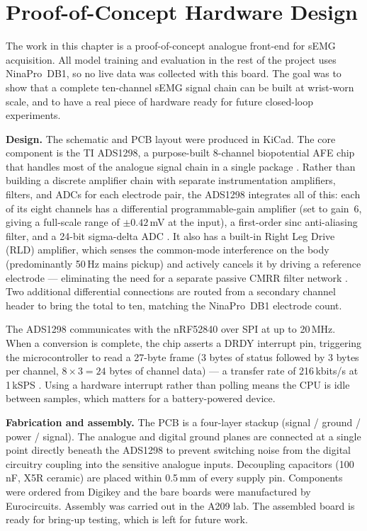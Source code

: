 \documentclass[11pt]{article}
\begin{document}
\section{Proof-of-Concept Hardware Design}
\label{sec:hw_exp}

The work in this chapter is a proof-of-concept analogue front-end for sEMG acquisition. All model training and evaluation in the rest of the project uses NinaPro~DB1, so no live data was collected with this board. The goal was to show that a complete ten-channel sEMG signal chain can be built at wrist-worn scale, and to have a real piece of hardware ready for future closed-loop experiments.

\textbf{Design.} The schematic and PCB layout were produced in KiCad. The core component is the TI ADS1298, a purpose-built 8-channel biopotential AFE chip that handles most of the analogue signal chain in a single package \cite{ads1298datasheet}. Rather than building a discrete amplifier chain with separate instrumentation amplifiers, filters, and ADCs for each electrode pair, the ADS1298 integrates all of this: each of its eight channels has a differential programmable-gain amplifier (set to gain~6, giving a full-scale range of ${\pm}0.42$\,mV at the input), a first-order sinc anti-aliasing filter, and a 24-bit sigma-delta ADC \cite{ads1298datasheet}. It also has a built-in Right Leg Drive (RLD) amplifier, which senses the common-mode interference on the body (predominantly 50\,Hz mains pickup) and actively cancels it by driving a reference electrode — eliminating the need for a separate passive CMRR filter network \cite{ads1298datasheet,ti_e2e_ads1298}. Two additional differential connections are routed from a secondary channel header to bring the total to ten, matching the NinaPro~DB1 electrode count.

The ADS1298 communicates with the nRF52840 over SPI at up to 20\,MHz. When a conversion is complete, the chip asserts a DRDY interrupt pin, triggering the microcontroller to read a 27-byte frame (3 bytes of status followed by 3 bytes per channel, $8\times3=24$ bytes of channel data) — a transfer rate of 216\,kbits/s at 1\,kSPS \cite{ads1298datasheet}. Using a hardware interrupt rather than polling means the CPU is idle between samples, which matters for a battery-powered device.

\textbf{Fabrication and assembly.} The PCB is a four-layer stackup (signal / ground / power / signal). The analogue and digital ground planes are connected at a single point directly beneath the ADS1298 to prevent switching noise from the digital circuitry coupling into the sensitive analogue inputs. Decoupling capacitors (100\,nF, X5R ceramic) are placed within 0.5\,mm of every supply pin. Components were ordered from Digikey and the bare boards were manufactured by Eurocircuits. Assembly was carried out in the A209 lab. The assembled board is ready for bring-up testing, which is left for future work.
\end{document}
